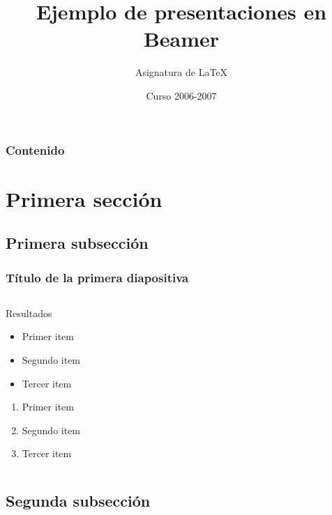 \documentclass{beamer}
\title{Ejemplo de presentaciones en \textbf{Beamer}}
\author{Asignatura de \LaTeX}
\date{Curso 2006-2007} %
\begin{document}
\begin{frame}
  \titlepage
\end{frame}


\begin{frame}
  \frametitle{Contenido}
  \tableofcontents[pausesections]
\end{frame}


\section{Primera sección}

\subsection{Primera subsección}

\begin{frame}
    \frametitle{Título de la primera diapositiva}
\begin{columns}
 \begin{column}{0.55\textwidth}
\begin{block}{Resultados}
    \begin{itemize}[<+->]
      \item  Primer item
      \item  Segundo item
      \item  Tercer item
    \end{itemize}
    \begin{enumerate}[<+-| alert@+>]
      \item  Primer item
      \item  Segundo item
      \item  Tercer item
    \end{enumerate}
\end{block}
 \end{column} \ \
\end{columns}
\end{frame}


\subsection{Segunda subsección}
\end{document}

